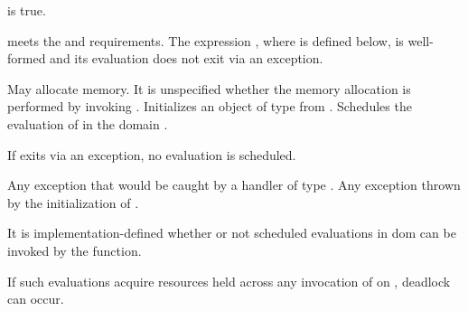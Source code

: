\begin{itemdescr}

\pnum
\mandates
{} is true.

\pnum
\expects
{} meets the  and
 requirements.
The expression , where  is defined below, is
well-formed and its evaluation does not exit via an exception.

\pnum
\effects
May allocate memory.
It is unspecified whether the memory allocation is performed by
invoking  .
Initializes an object  of type  from
.
Schedules the evaluation of  in the domain
.
\begin{note}
If  exits via an exception, no evaluation
is scheduled.
\end{note}

\pnum
\throws
Any exception that would be caught by a handler of type
.
Any exception thrown by the initialization of .

\pnum
\remarks
It is implementation-defined whether or not scheduled
evaluations in dom can be invoked by the 
function.
\begin{note}
If such evaluations acquire resources held across any invocation
of  on , deadlock can occur.
\end{note}

\end{itemdescr}
